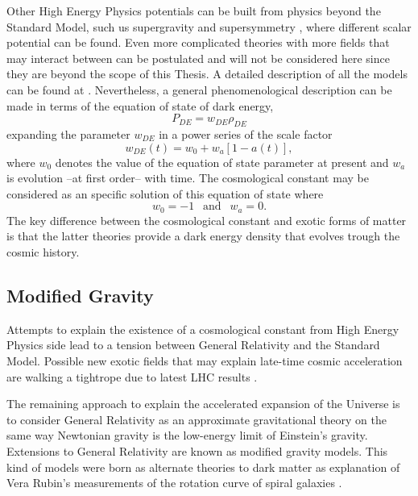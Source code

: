 Other High Energy Physics potentials can be built from physics beyond the Standard Model, such us supergravity and supersymmetry \cite{1999PhLB..468...40B,1999astro.ph.12005B,2000PhRvD..61j3502B,1999PhRvD..60f3502B}, where different scalar potential can be found. Even more complicated theories with more fields that may interact between can be postulated and will not be considered here since they are beyond the scope of this Thesis. A detailed description of all the models can be found at \cite{2010deto.book.....A}. Nevertheless, a general phenomenological description can be made in terms of the equation of state of dark energy,
\begin{equation}
P_{DE} = w_{DE}\rho_{DE}
\end{equation}
expanding the parameter $w_{DE}$ in a power series of the scale factor
\begin{equation}
w_{DE}(t) = w_0 +w_a[1-a(t)],
\end{equation}
where $w_0$ denotes the value of the equation of state parameter at present and $w_a$ is evolution --at first order-- with time. The cosmological constant may be considered as an specific solution of this equation of state where
\begin{equation}
w_0=-1\ \ \mbox{ and }\ \ w_a=0.
\end{equation}
The key difference between the cosmological constant and exotic forms of matter is that the latter theories provide a dark energy density that evolves trough the cosmic history.

\subsection{Modified Gravity}
Attempts to explain the existence of a cosmological constant from High Energy Physics side lead to a tension between General Relativity and the Standard Model. Possible new exotic fields that may explain late-time cosmic acceleration are walking a tightrope due to latest LHC results \cite{2015arXiv150603091B}.
\newline

The remaining approach to explain the accelerated expansion of the Universe is to consider General Relativity as an approximate gravitational theory on the same way Newtonian gravity is the low-energy limit of Einstein's gravity. Extensions to General Relativity are known as modified gravity models. This kind of models were born as alternate theories to dark matter as explanation of Vera Rubin's measurements of the rotation curve of spiral galaxies \cite{1982ApJ...253...70B,1983Sci...220.1339R,1985ApJ...289...81R,1985ApJ...297..423B}. 
\newline

